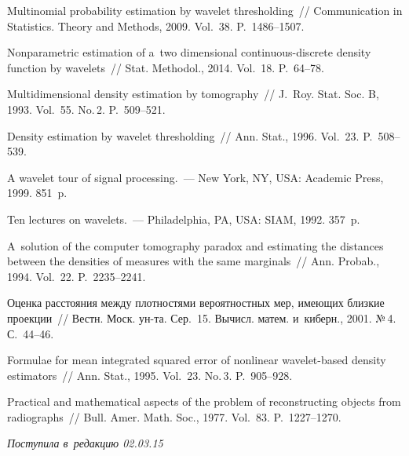 \begin{multicols}{2}
{{\begin{thebibliography}{99}
 Multinomial probability estimation by wavelet
thresholding~// Communication in Statistics. Theory and Methods, 2009.
Vol.~38. P.~1486--1507.

 Nonparametric estimation of
a~two dimensional continuous-discrete density function by wavelets~//
Stat. Methodol., 2014. Vol.~18. P.~64--78.

 Multidimensional density estimation
by tomography~// J.~Roy. Stat. Soc. B, 1993. Vol.~55. No.\,2. P.~509--521.

Density estimation by wavelet thresholding~// Ann. Stat., 1996.
Vol.~23. P.~508--539.

 A wavelet tour of signal processing.~--- New York, NY, USA: Academic Press, 1999.
851~p.

 Ten lectures on wavelets.~--- Philadelphia, PA, USA: SIAM, 1992. 357~p.

 A~solution of the computer tomography
paradox and estimating the distances between the
densities of measures with the same marginals~// Ann. Probab., 1994.
Vol.~22. P.~2235--2241.

 Оценка расстояния между
плотностями вероятностных мер, имеющих близкие проекции~// Вестн.
Моск. ун-та. Сер.~15. Вычисл. матем. и~киберн., 2001. №\,4. С.~44--46.

 Formulae for mean integrated squared error of nonlinear wavelet-based density estimators~//
 Ann. Stat., 1995. Vol.~23. No.\,3. P.~905--928.

 Practical and mathematical
aspects of the problem of reconstructing objects from radiographs~//
Bull. Amer. Math. Soc., 1977. Vol.~83. P.~1227--1270.
 \end{thebibliography}

 }
 }

\end{multicols}

\vspace*{-3pt}

\hfill{\small\textit{Поступила в~редакцию 02.03.15}}


